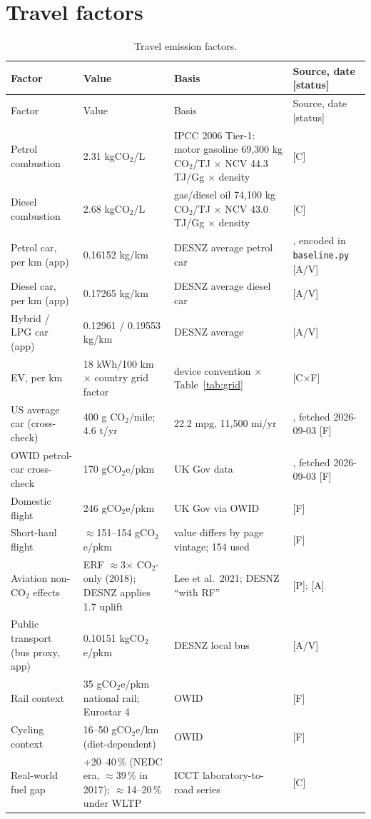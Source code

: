 \documentclass[11pt,a4paper]{article}
\begin{document}
\section{Travel factors}
\label{sec:travel}

\begin{longtable}{@{}p{4.6cm}p{2.6cm}p{5.4cm}p{3.6cm}@{}}
\caption{Travel emission factors.}\label{tab:travel}\\
\toprule
Factor & Value & Basis & Source, date [status] \\
\midrule
\endfirsthead
\toprule
Factor & Value & Basis & Source, date [status] \\
\midrule
\endhead
Petrol combustion & 2.31 kgCO$_2$/L & IPCC 2006 Tier-1: motor gasoline 69{,}300 kg CO$_2$/TJ $\times$ NCV 44.3 TJ/Gg $\times$ density & \cite{ipcc2006_vol2} [C] \\
Diesel combustion & 2.68 kgCO$_2$/L & gas/diesel oil 74{,}100 kg CO$_2$/TJ $\times$ NCV 43.0 TJ/Gg $\times$ density & \cite{ipcc2006_vol2} [C] \\
Petrol car, per km (app) & 0.16152 kg/km & DESNZ average petrol car & \cite{desnz2026}, encoded in \texttt{baseline.py} [A/V] \\
Diesel car, per km (app) & 0.17265 kg/km & DESNZ average diesel car & \cite{desnz2026} [A/V] \\
Hybrid / LPG car (app) & 0.12961 / 0.19553 kg/km & DESNZ average & \cite{desnz2026} [A/V] \\
EV, per km & 18 kWh/100 km $\times$ country grid factor & device convention $\times$ Table~\ref{tab:grid} & \cite{ember_grid} [C$\times$F] \\
US average car (cross-check) & 400 g CO$_2$/mile; 4.6 t/yr & 22.2 mpg, 11{,}500 mi/yr & \cite{epa_vehicle}, fetched 2026-09-03 [F] \\
OWID petrol-car cross-check & 170 gCO$_2$e/pkm & UK Gov data & \cite{owid_travel}, fetched 2026-09-03 [F] \\
Domestic flight & 246 gCO$_2$e/pkm & UK Gov via OWID & \cite{owid_travel} [F] \\
Short-haul flight & $\approx$151--154 gCO$_2$e/pkm & value differs by page vintage; 154 used & \cite{owid_travel} [F] \\
Aviation non-CO$_2$ effects & ERF $\approx$3$\times$ CO$_2$-only (2018); DESNZ applies 1.7 uplift & Lee et al.\ 2021; DESNZ ``with RF'' & \cite{lee2021} [P]; \cite{desnz2025} [A] \\
Public transport (bus proxy, app) & 0.10151 kgCO$_2$e/pkm & DESNZ local bus & \cite{desnz2026} [A/V] \\
Rail context & 35 gCO$_2$e/pkm national rail; Eurostar 4 & OWID & \cite{owid_travel} [F] \\
Cycling context & 16--50 gCO$_2$e/km (diet-dependent) & OWID & \cite{owid_travel} [F] \\
Real-world fuel gap & +20--40\,\% (NEDC era, $\approx$39\,\% in 2017); $\approx$14--20\,\% under WLTP & ICCT laboratory-to-road series & \cite{tietge2017} [C] \\
\bottomrule
\end{longtable}
\end{document}
